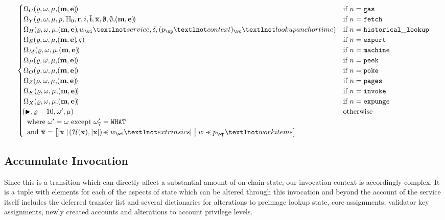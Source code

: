 \begin{align}
\begin{cases}
      \Omega_G(\gascounter, \registers, \memory, \tup{\mathbf{m}, \mathbf{e}}) &\when n = \mathtt{gas} \\
      \Omega_Y(\gascounter, \registers, \memory, p, \zerohash, \mathbf{r}, i, \overline{\mathbf{i}}, \overline{\mathbf{x}}, \none, \none, \tup{\mathbf{m}, \mathbf{e}}) &\when n = \mathtt{fetch}\\
      \Omega_H(\gascounter, \registers, \memory, \tup{\mathbf{m}, \mathbf{e}}, w_\wi¬service, \accounts, (p_\wp¬context)_\wc¬lookupanchortime) &\when n = \mathtt{historical\_lookup}\\
      \Omega_E(\gascounter, \registers, \memory, \tup{\mathbf{m}, \mathbf{e}}, \segoff) &\when n = \mathtt{export}\\
      \Omega_M(\gascounter, \registers, \memory, \tup{\mathbf{m}, \mathbf{e}}) &\when n = \mathtt{machine}\\
      \Omega_P(\gascounter, \registers, \memory, \tup{\mathbf{m}, \mathbf{e}}) &\when n = \mathtt{peek}\\
      \Omega_O(\gascounter, \registers, \memory, \tup{\mathbf{m}, \mathbf{e}}) &\when n = \mathtt{poke}\\
      \Omega_Z(\gascounter, \registers, \memory, \tup{\mathbf{m}, \mathbf{e}}) &\when n = \mathtt{pages}\\
      \Omega_K(\gascounter, \registers, \memory, \tup{\mathbf{m}, \mathbf{e}}) &\when n = \mathtt{invoke}\\
      \Omega_X(\gascounter, \registers, \memory, \tup{\mathbf{m}, \mathbf{e}}) &\when n = \mathtt{expunge}\\
      \tup{\continue, \gascounter - 10, \registers', \memory} &\otherwise\\
      \multicolumn{2}{l}{\where \registers' = \registers \exc \registers'_7 = \mathtt{WHAT}} \\
      \multicolumn{2}{l}{\also \overline{\mathbf{x}} = \sq{\build{
        \sq{\build{
          \mathbf{x}
        }{
          \tup{\blake(\mathbf{x}), \len{\mathbf{x}}} \orderedin \wiX_\wi¬extrinsics
        }}
      }{
        \wiX \orderedin p_\wp¬workitems
      }}}
    \end{cases}
\end{align}

\subsection{Accumulate Invocation}\label{sec:accumulateinvocation}

Since this is a transition which can directly affect a substantial amount of on-chain state, our invocation context is accordingly complex. It is a tuple with elements for each of the aspects of state which can be altered through this invocation and beyond the account of the service itself includes the deferred transfer list and several dictionaries for alterations to preimage lookup state, core assignments, validator key assignments, newly created accounts and alterations to account privilege levels.

